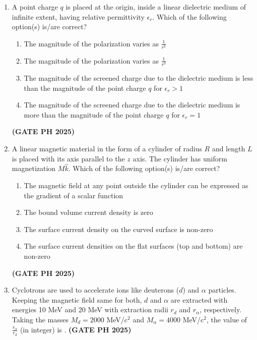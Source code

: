 \documentclass[14pt, a4paper]{extarticle}
\begin{document}
\begin{enumerate}[label=\textbf{Q.\arabic*}]
\item A point charge $q$ is placed at the origin, inside a linear dielectric medium of infinite extent, having relative permittivity $\epsilon_r$. Which of the following option(s) is/are correct?
\begin{enumerate}
\item The magnitude of the polarization varies as $\frac{1}{r^2}$
\item The magnitude of the polarization varies as $\frac{1}{r^3}$
\item The magnitude of the screened charge due to the dielectric medium is less than the magnitude of the point charge $q$ for $\epsilon_r > 1$
\item The magnitude of the screened charge due to the dielectric medium is more than the magnitude of the point charge $q$ for $\epsilon_r = 1$
\end{enumerate}
\hfill \textbf{(GATE PH 2025)}

\item A linear magnetic material in the form of a cylinder of radius $R$ and length $L$ is placed with its axis parallel to the $z$ axis. The cylinder has uniform magnetization $M\hat{k}$. Which of the following option(s) is/are correct?
\begin{enumerate}
\item The magnetic field at any point outside the cylinder can be expressed as the gradient of a scalar function
\item The bound volume current density is zero
\item The surface current density on the curved surface is non-zero
\item The surface current densities on the flat surfaces (top and bottom) are non-zero
\end{enumerate}
\hfill \textbf{(GATE PH 2025)}

\item Cyclotrons are used to accelerate ions like deuterons ($d$) and $\alpha$ particles. Keeping the magnetic field same for both, $d$ and $\alpha$ are extracted with energies 10 MeV and 20 MeV with extraction radii $r_d$ and $r_\alpha$, respectively. Taking the masses $M_d = 2000$ MeV/c$^2$ and $M_\alpha = 4000$ MeV/c$^2$, the value of $\frac{r_\alpha}{r_d}$ (in integer) is \underline{\hspace{3cm}}.
\hfill \textbf{(GATE PH 2025)}


\end{enumerate}
\end{document}
